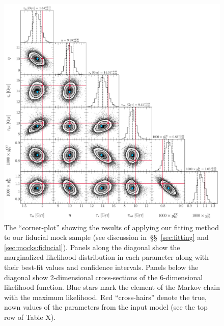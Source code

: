 \documentclass[ms.tex]{subfiles}
\begin{document}
\begin{figure}
\centering
\includegraphics[scale = 0.5]{fiducial_76k8.pdf}
\caption{
The ``corner-plot'' showing the results of applying our fitting method to our
fiducial mock sample (see discussion in~\S\S~\ref{sec:fitting} and
\ref{sec:mocks:fiducial}).
Panels along the diagonal show the marginalized likelihood distribution in each
parameter along with their best-fit values and confidence intervals.
Panels below the diagonal show 2-dimensional cross-sections of the
6-dimensional likelihood function.
Blue stars mark the element of the Markov chain with the maximum likelihood.
Red ``cross-hairs'' denote the true, nown values of the parameters from the
input model (see the top row of Table X).
}
\label{fig:fiducial_mock_corner}
\end{figure}
\end{document}
